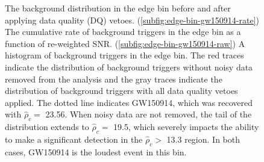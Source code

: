 \begin{figure}[!ht]%
\centering
  \caption[Edge bin histograms - GW150914 analysis]{The background distribution in the edge bin before and after applying data quality (DQ) vetoes. %
           (\ref{subfig:edge-bin-gw150914-rate}) The cumulative rate of background triggers %
           in the edge bin as a function of re-weighted SNR. %
           (\ref{subfig:edge-bin-gw150914-raw}) A histogram of background triggers %
           in the edge bin. %
           The red traces indicate the %
           distribution of background triggers without noisy data removed from the analysis and %
           the gray traces indicate the distribution of background triggers with all data %
           quality vetoes applied. %
           The dotted line indicates GW150914, which was recovered with $\hat{\rho}_{c} =$ 23.56. %
           When noisy data are not removed, the tail of the distribution extends to $\hat{\rho}_{c} =$ 19.5, %
           which severely impacts the ability to make a significant detection in the %
           $\hat{\rho}_{c} >$ 13.3 region. In both cases, GW150914 is the loudest event %
           in this bin.
          }
\label{fig:edge-bin-far_GW150914}
\end{figure}

